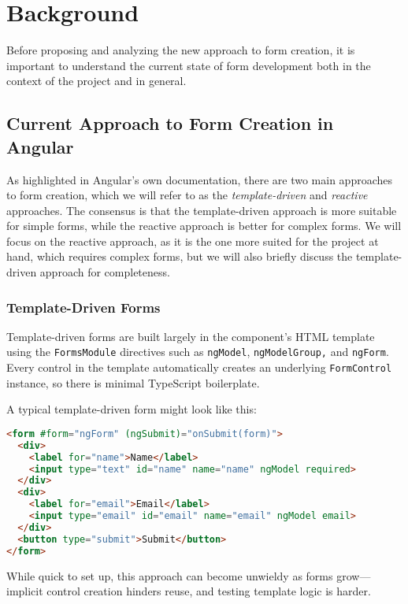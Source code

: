 \chapter{Background}

Before proposing and analyzing the new approach to form creation, it is important to understand the current state of
form development both in the context of the project and in general.

\section{Current Approach to Form Creation in Angular}

As highlighted in Angular's own documentation\cite{Angular:forms}, there are two main approaches to form creation, which
we will refer to as the \textit{template-driven} and \textit{reactive} approaches.
The consensus is that the template-driven approach is more suitable for simple forms, while the reactive approach is
better for complex forms.
We will focus on the reactive approach, as it is the one more suited for the project at hand, which requires complex
forms, but we will also briefly discuss the template-driven approach for completeness.

\subsection{Template-Driven Forms}

Template-driven forms are built largely in the component’s HTML template using the \texttt{FormsModule} directives such
as \texttt{ngModel}, \texttt{ngModelGroup,} and \texttt{ngForm}.
Every control in the template automatically creates an underlying \texttt{FormControl} instance, so there is minimal
TypeScript boilerplate.

A typical template-driven form might look like this:
\begin{lstlisting}[language=HTML,caption={Template-Driven Form HTML}, label={lst:templateHTML}]
<form #form="ngForm" (ngSubmit)="onSubmit(form)">
  <div>
    <label for="name">Name</label>
    <input type="text" id="name" name="name" ngModel required>
  </div>
  <div>
    <label for="email">Email</label>
    <input type="email" id="email" name="email" ngModel email>
  </div>
  <button type="submit">Submit</button>
</form>
\end{lstlisting}

While quick to set up, this approach can become unwieldy as forms grow—implicit control creation hinders reuse, and
testing template logic is harder.

